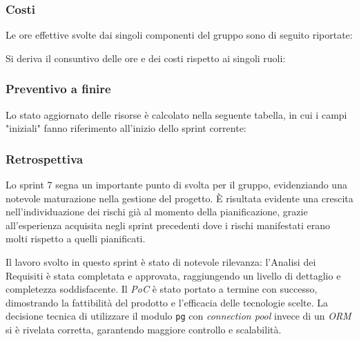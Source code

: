 \documentclass[10pt, letterpaper]{article}
\begin{document}
\subsubsection{Costi}
Le ore effettive svolte dai singoli componenti del gruppo sono di seguito riportate:

\setRuoloFilippo{\Amm}
\setRuoloChristian{\Progr}
\setRuoloValeria{\Verif}
\setRuoloGiuseppe{\Amm}
\setRuoloFrancesco{\Verif}
\setRuoloLuca{\Progr}
\setRuoloLeonardo{\Resp}



Si deriva il consuntivo delle ore e dei costi rispetto ai singoli ruoli:

\subsubsection{Preventivo a finire}
Lo stato aggiornato delle risorse è calcolato nella seguente tabella, in cui i campi "iniziali" fanno riferimento all'inizio dello sprint corrente:


\subsubsection{Retrospettiva}
Lo sprint 7 segna un importante punto di svolta per il gruppo, evidenziando una notevole maturazione nella gestione del progetto.
È risultata evidente una crescita nell'individuazione dei rischi già al momento della pianificazione, grazie all'esperienza acquisita negli sprint precedenti 
dove i rischi manifestati erano molti rispetto a quelli pianificati.

Il lavoro svolto in questo sprint è stato di notevole rilevanza: l'Analisi dei Requisiti è stata completata e approvata, raggiungendo un livello di dettaglio e 
completezza soddisfacente. Il \textit{PoC} è stato portato a termine con successo, dimostrando la fattibilità del prodotto e l'efficacia delle tecnologie scelte. 
La decisione tecnica di utilizzare il modulo \texttt{pg} con \textit{connection pool} invece di un \textit{ORM} si è rivelata corretta, garantendo maggiore controllo 
e scalabilità.
\end{document}
